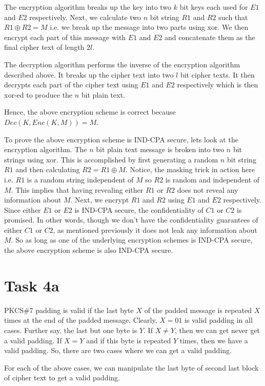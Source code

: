 \documentclass{article}
\begin{document}
    The encryption algorithm breaks up the key into two $k$ bit keys each used for $E1$ and $E2$ respectively. Next, we calculate two $n$ bit string $R1$ and $R2$ such that $R1 \oplus R2 = M$ i.e. we break up the message into two parts using xor. We then encrypt each part of this message with $E1$ and $E2$ and concatenate them as the final cipher text of length $2l$.

    The decryption algorithm performs the inverse of the encryption algorithm described above. It breaks up the cipher text into two $l$ bit cipher texts. It then decrypts each part of the cipher text using $E1$ and $E2$ respectively which is then xor-ed to produce the $n$ bit plain text.

    Hence, the above encryption scheme is correct because $Dec(K, Enc(K, M)) = M$.

    To prove the above encryption scheme is IND-CPA secure, lets look at the encryption algorithm. The $n$ bit plain text message is broken into two $n$ bit strings using xor. This is accomplished by first generating a random $n$ bit string $R1$ and then calculating $R2 = R1 \oplus M$. Notice, the masking trick in action here i.e. $R1$ is a random string independent of $M$ so $R2$ is random and independent of $M$. This implies that having revealing either $R1$ or $R2$ does not reveal any information about $M$. Next, we encrypt $R1$ and $R2$ using $E1$ and $E2$ respectively. Since either $E1$ or $E2$ is IND-CPA secure, the confidentiality of $C1$ or $C2$ is promised. In other words, though we don't have the confidentiality guarantees of either $C1$ or $C2$, as mentioned previously it does not leak any information about $M$. So as long as one of the underlying encryption schemes is IND-CPA secure, the above encryption scheme is also IND-CPA secure.

    \section*{Task 4a}
    PKCS\#7 padding is valid if the last byte $X$ of the padded message is repeated $X$ times at the end of the padded message. Clearly, $X = 01$ is valid padding in all cases. Further say, the last but one byte is $Y$. If $X \ne Y$, then we can get never get a valid padding. If $X = Y$ and if this byte is repeated $Y$ times, then we have a valid padding. So, there are two cases where we can get a valid padding.

    For each of the above cases, we can manipulate the last byte of second last block of cipher text to get a valid padding.
\end{document}
